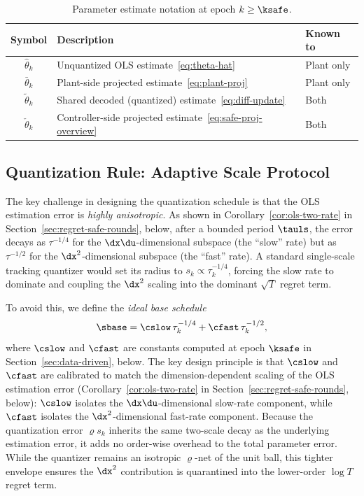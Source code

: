 \documentclass[11pt,journal,onecolumn]{IEEEtran}
\begin{document}
\begin{table}[h]
\centering
\caption{Parameter estimate notation at epoch $k \geq \ksafe$.}
\label{tab:theta-notation}
\begin{tabular}{c l l}
\toprule
\textbf{Symbol} & \textbf{Description} & \textbf{Known to} \\
\midrule
$\hat\theta_k$ & Unquantized OLS estimate~\eqref{eq:theta-hat} & Plant only \\
$\bar\theta_k$ & Plant-side projected estimate~\eqref{eq:plant-proj} & Plant only \\
$\tilde\theta_k$ & Shared decoded (quantized) estimate~\eqref{eq:diff-update} & Both \\
$\check\theta_k$ & Controller-side projected estimate~\eqref{eq:safe-proj-overview} & Both \\
\bottomrule
\end{tabular}
\end{table}
\subsection{Quantization Rule: Adaptive Scale Protocol}

The key challenge in designing the quantization schedule is that the OLS estimation error is \emph{highly anisotropic}. As shown in Corollary~\ref{cor:ols-two-rate} in Section~\ref{sec:regret-safe-rounds}, below, after a bounded period $\tauls$, the error decays as $\tau^{-1/4}$ for the $\dx\du$-dimensional subspace (the ``slow'' rate) but as $\tau^{-1/2}$ for the $\dx^2$-dimensional subspace (the ``fast'' rate). A standard single-scale tracking quantizer would set its radius to $s_k \propto \tau_k^{-1/4}$, forcing the slow rate to dominate and coupling the $\dx^2$ scaling into the dominant $\sqrt{T}$ regret term.

To avoid this, we define the \emph{ideal base schedule}
\begin{equation}
    \label{eq:two-scale-schedule}
    \sbase = \cslow\,\tau_k^{-1/4} + \cfast\,\tau_k^{-1/2},
\end{equation}
where $\cslow$ and $\cfast$ are constants computed at epoch $\ksafe$ in Section~\ref{sec:data-driven}, below. The key design principle is that $\cslow$ and $\cfast$ are calibrated to match the dimension-dependent scaling of the OLS estimation error (Corollary~\ref{cor:ols-two-rate} in Section~\ref{sec:regret-safe-rounds}, below): $\cslow$ isolates the $\dx\du$-dimensional slow-rate component, while $\cfast$ isolates the $\dx^2$-dimensional fast-rate component. Because the quantization error $\varrho s_k$ inherits the same two-scale decay as the underlying estimation error, it adds no order-wise overhead to the total parameter error. While the quantizer remains an isotropic $\varrho$-net of the unit ball, this tighter envelope ensures the $\dx^2$ contribution is quarantined into the lower-order $\log T$ regret term.
\end{document}
